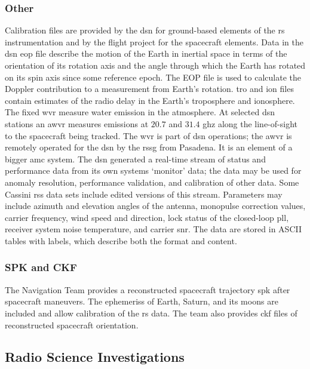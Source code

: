 \documentclass[oneside]{book}
\theoremstyle{mystyle}
\begin{document}
\subsubsection{\footnotesize Other}
Calibration files are provided by the \gls{dsn} for ground-based elements of the \gls{rs} instrumentation and by the flight project for the spacecraft elements. Data in the \gls{dsn} \gls{eop} file describe the motion of the Earth in inertial space in terms of the orientation of its rotation axis and the angle through which the Earth has rotated on its spin axis since some reference epoch. The EOP file is used to calculate the Doppler contribution to a measurement from Earth's rotation. \gls{tro} and \gls{ion} files contain estimates of the radio delay in the Earth's troposphere and ionosphere. The fixed \gls{wvr} measure water emission in the atmosphere. At selected \gls{dsn} stations an \gls{awvr} measures emissions
at $20.7$ and $31.4$ \gls{ghz} along the line-of-sight to the spacecraft being tracked. The \gls{wvr} is part of \gls{dsn} operations; the \gls{awvr} is remotely operated for the \gls{dsn} by the \gls{rssg} from Pasadena. It is an element of a bigger \gls{amc} system. The \gls{dsn} generated a real-time stream of status and performance data from its own
systems ‘monitor’ data; the data may be used for anomaly resolution, performance
validation, and calibration of other data. Some Cassini \gls{rss} data sets include edited versions of this stream. Parameters may include \gls{azimuth} and \gls{elevation} angles of the antenna, \gls{monopulse} correction values, \gls{carrier} \gls{frequency}, wind speed and direction, lock status of the \gls{closed-loop} \gls{pll}, receiver system noise temperature, and \gls{carrier} \gls{snr}. The data are stored in ASCII tables with labels, which describe both the format and content. 

\subsubsection{\footnotesize SPK and CKF}

The Navigation Team provides a reconstructed spacecraft trajectory \gls{spk} after spacecraft maneuvers. The \glspl{ephemeris} of Earth, Saturn, and its moons are included and allow  calibration of the \gls{rs} data. The team also provides \gls{ckf} files of reconstructed spacecraft orientation. 
%
\subsection{Radio Science Investigations}
%
\end{document}
